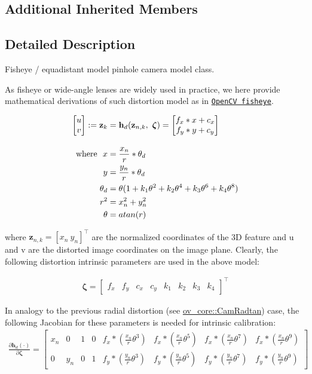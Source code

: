 \subsection*{Additional Inherited Members}


\subsection{Detailed Description}
Fisheye / equadistant model pinhole camera model class. 

As fisheye or wide-\/angle lenses are widely used in practice, we here provide mathematical derivations of such distortion model as in \href{https://docs.opencv.org/3.4/db/d58/group__calib3d__fisheye.html#details}{\tt Open\+CV fisheye}.

\begin{align*} \begin{bmatrix} u \\ v \end{bmatrix}:= \mathbf{z}_k &= \mathbf h_d(\mathbf{z}_{n,k}, ~\boldsymbol\zeta) = \begin{bmatrix} f_x * x + c_x \\ f_y * y + c_y \end{bmatrix}\\[1em] \empty {\rm where}~~ x &= \frac{x_n}{r} * \theta_d \\ y &= \frac{y_n}{r} * \theta_d \\ \theta_d &= \theta (1 + k_1 \theta^2 + k_2 \theta^4 + k_3 \theta^6 + k_4 \theta^8) \\ \quad r^2 &= x_n^2 + y_n^2 \\ \theta &= atan(r) \end{align*}

where $ \mathbf{z}_{n,k} = [ x_n ~ y_n ]^\top$ are the normalized coordinates of the 3D feature and u and v are the distorted image coordinates on the image plane. Clearly, the following distortion intrinsic parameters are used in the above model\+:

\begin{align*} \boldsymbol\zeta = \begin{bmatrix} f_x & f_y & c_x & c_y & k_1 & k_2 & k_3 & k_4 \end{bmatrix}^\top \end{align*}

In analogy to the previous radial distortion (see \hyperlink{classov__core_1_1CamRadtan}{ov\+\_\+core\+::\+Cam\+Radtan}) case, the following Jacobian for these parameters is needed for intrinsic calibration\+: \begin{align*} \frac{\partial \mathbf h_d (\cdot)}{\partial \boldsymbol\zeta} = \begin{bmatrix} x_n & 0 & 1 & 0 & f_x*(\frac{x_n}{r}\theta^3) & f_x*(\frac{x_n}{r}\theta^5) & f_x*(\frac{x_n}{r}\theta^7) & f_x*(\frac{x_n}{r}\theta^9) \\[5pt] 0 & y_n & 0 & 1 & f_y*(\frac{y_n}{r}\theta^3) & f_y*(\frac{y_n}{r}\theta^5) & f_y*(\frac{y_n}{r}\theta^7) & f_y*(\frac{y_n}{r}\theta^9) \end{bmatrix} \end{align*}

